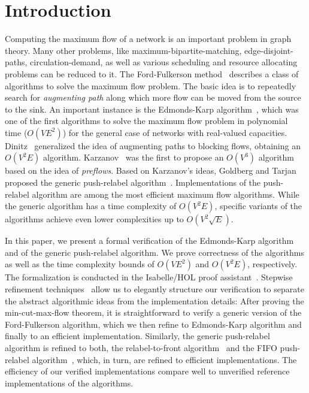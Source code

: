 \documentclass[smallcondensed]{svjour3}     %
\begin{document}
\section{Introduction}
Computing the maximum flow of a network is an important problem in graph theory.
Many other problems, like maximum-bipartite-matching, edge-disjoint-paths, circulation-demand, as well as various scheduling and resource allocating problems can be reduced to it.
The Ford-Fulkerson method~\cite{FF56} describes a class of algorithms to solve the maximum flow problem. 
The basic idea is to repeatedly search for \emph{augmenting path} along which more flow can be moved from the source to the sink.
An important instance is the Edmonds-Karp algorithm~\cite{EK72},
which was one of the first algorithms to solve the maximum flow problem in polynomial time ($O(VE^2)$) for the general case of networks with real-valued capacities.
Dinitz~\cite{Di06} generalized the idea of augmenting paths to blocking flows, obtaining an $O(V^2E)$ algorithm. 
Karzanov~\cite{Ka74} was the first to propose an $O(V^3)$ algorithm based on the idea of \emph{preflows}. Based on Karzanov's ideas, Goldberg and Tarjan proposed
the generic push-relabel algorithm~\cite{GoTa88}.
Implementations of the push-relabel algorithm are among the most efficient maximum flow algorithms. While the generic algorithm has a time complexity of $O(V^2E)$,
specific variants of the algorithms achieve even lower complexities up to $O(V^2\sqrt{E})$.

In this paper, we present a formal verification of the Edmonds-Karp algorithm and of the generic push-relabel algorithm.
We prove correctness of the algorithms as well as the time complexity bounds of $O(VE^2)$ and $O(V^2E)$, respectively. 
The formalization is conducted in the Isabelle/HOL proof assistant~\cite{NPW02}. 
Stepwise refinement techniques~\cite{Wirth71,Back78,BaWr98} allow us to elegantly structure our verification to separate the abstract algorithmic ideas from
the implementation details: After proving the min-cut-max-flow theorem, it is straightforward to verify a generic version of the Ford-Fulkerson algorithm,
which we then refine to Edmonds-Karp algorithm and finally to an efficient implementation. 
Similarly, the generic push-relabel algorithm is refined to both, the relabel-to-front algorithm~\cite{CLRS09} and the FIFO push-relabel algorithm~\cite{GoTa88},
which, in turn, are refined to efficient implementations. The efficiency of our verified implementations compare well to unverified reference implementations of 
the algorithms.
\end{document}
